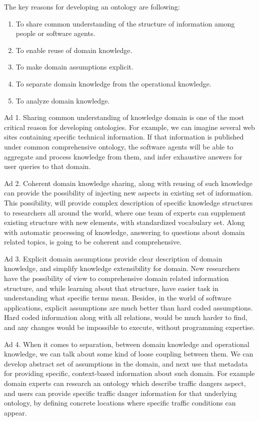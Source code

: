 The key reasons for developing an ontology \cite{OntDev101} are following:
\begin{enumerate}
    \setlength{\itemsep}{0cm}
    \setlength{\parskip}{0cm}

    \item To share common understanding of the structure of information among people or software agents.
    \item To enable reuse of domain knowledge.
    \item To make domain assumptions explicit.
    \item To separate domain knowledge from the operational knowledge.
    \item To analyze domain knowledge.
\end{enumerate}

Ad 1. Sharing common understanding of knowledge domain is one of the most critical reason for developing ontologies. For example, we can imagine several web sites containing specific technical information. If that information is published under common comprehensive ontology, the software agents will be able to aggregate and process knowledge from them, and infer exhaustive answers for user queries to that domain. 

Ad 2. Coherent domain knowledge sharing, along with reusing of such knowledge can provide the possibility of injecting new aspects in existing set of information. This possibility, will provide complex description of specific knowledge structures to researchers all around the world, where one team of experts can supplement existing structure with new elements, with standardized vocabulary set. Along with automatic processing of knowledge, answering to questions about domain related topics, is going to be coherent and comprehensive.

Ad 3. Explicit domain assumptions provide clear description of domain knowledge, and simplify knowledge extensibility for domain. New researchers have the possibility of view to comprehensive domain related information structure, and while learning about that structure, have easier task in understanding what specific terms mean. Besides, in the world of software applications, explicit assumptions are much better than hard coded assumptions. Hard coded information along with all relations, would be much harder to find, and any changes would be impossible to execute, without programming expertise.

Ad 4. When it comes to separation, between domain knowledge and operational knowledge, we can talk about some kind of loose coupling between them. We can develop abstract set of assumptions in the domain, and next use that metadata for providing specific, context-based information about such domain. For example domain experts can research an ontology which describe traffic dangers aspect, and users can provide specific traffic danger information for that underlying ontology, by defining concrete locations where specific traffic conditions can appear.

